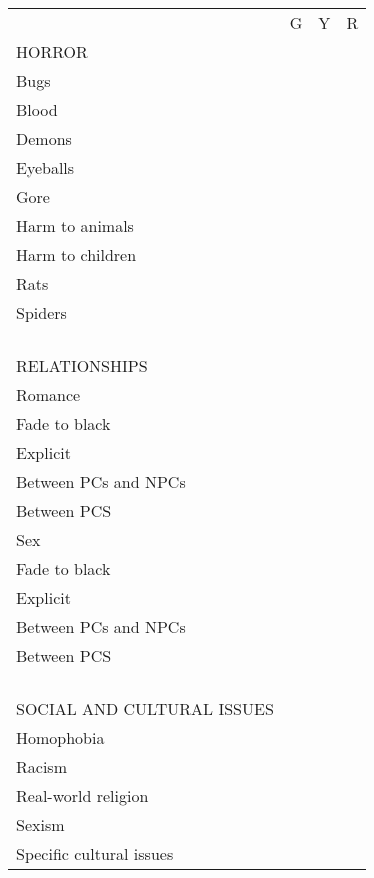 \documentclass[11pt,twoside,a4paper]{article}
\begin{document}
\begin{multicols}{2}
	\begin{tabular}{ p{} c c c}
									&	G	&	Y	&	R	\\
									
		HORROR \dotfill				&		&		&		\\ 
		Bugs \dotfill				&		&		&		\\ 
		Blood \dotfill				&		&		&		\\ 
		Demons \dotfill				&		&		&		\\ 
		Eyeballs \dotfill			&		&		&		\\ 
		Gore \dotfill				&		&		&		\\ 
		Harm to animals \dotfill	&		&		&		\\ 
		Harm to children \dotfill	&		&		&		\\ 
		Rats \dotfill				&		&		&		\\ 
		Spiders \dotfill			&		&		&		\\ 
		
		\hrulefill			&		&		&		\\
		\hrulefill			&		&		&		\\
		\hrulefill			&		&		&		\\
							&		&		&		\\
		
		RELATIONSHIPS \dotfill			&		&		&		\\
		Romance \dotfill				&		&		&		\\
		Fade to black \dotfill			&		&		&		\\
		Explicit \dotfill				&		&		&		\\
		Between PCs and NPCs \dotfill	&		&		&		\\
		Between PCS \dotfill			&		&		&		\\
		Sex \dotfill					&		&		&		\\
		Fade to black \dotfill			&		&		&		\\
		Explicit \dotfill				&		&		&		\\
		Between PCs and NPCs \dotfill	&		&		&		\\
		Between PCS \dotfill			&		&		&		\\
		
		\hrulefill			&		&		&		\\
		\hrulefill			&		&		&		\\
		\hrulefill			&		&		&		\\
							&		&		&		\\
		
		SOCIAL AND CULTURAL ISSUES \dotfill		&		&		&		\\
		Homophobia \dotfill						&		&		&		\\
		Racism \dotfill							&		&		&		\\
		Real-world religion \dotfill			&		&		&		\\
		Sexism \dotfill							&		&		&		\\
		Specific cultural issues \dotfill		&		&		&		\\
		

\end{tabular}
\end{multicols}
\end{document}
